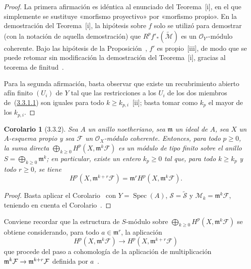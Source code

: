 \documentclass[10pt,oneside,openany]{book}
\theoremstyle{egaenv}\newtheorem*{env}{---}
\theoremstyle{egastatement}
\newtheorem*{corollary}{Corolario}
\theoremstyle{egadescription}
\renewcommand{\geq}{\geqslant}
\renewcommand{\to}{\mathchoice{\longrightarrow}{\rightarrow}{\rightarrow}{\rightarrow}}
\begin{document}
\begin{proof}
La primera afirmación es idéntica al enunciado del Teorema~[i], en el que simplemente se sustituye «morfismo proyectivo» por «morfismo propio».
En la demostración del Teorema~[i], la hipótesis sobre $f$ solo se utilizó para demostrar (con la notación de aquella demostración) que $R^pf'_*(\widetilde{\mathcal M})$ es un $\mathcal O_{Y'}$-módulo coherente.
Bajo las hipótesis de la Proposición~, $f'$ es propio~[iii], de modo que se puede retomar sin modificación la demostración del Teorema~[i], gracias al teorema de finitud~.

Para la segunda afirmación, basta observar que existe un recubrimiento abierto afín finito $(U_i)$ de $Y$ tal que las restricciones a los $U_i$ de los dos miembros de~(\hyperref[III.3.3.1.1]{3.3.1.1}) son iguales para todo $k\geq k_{p,i}$~[ii]; basta tomar como $k_p$ el mayor de los $k_{p,i}$.
\end{proof}

\begin{corollary}[3.3.2]
\label{III.3.3.2}
\label{III.3.3.2-fr}
Sea $A$ un anillo noetheriano, sea $\mathfrak m$ un ideal de $A$, sea $X$ un $A$-esquema propio y sea $\mathcal F$ un $\mathcal O_X$-módulo coherente.
Entonces, para todo $p\geq0$, la suma directa $\bigoplus_{k\geq0}H^p(X,\mathfrak m^k\mathcal F)$ es un módulo de tipo finito sobre el anillo $S=\bigoplus_{k\geq0}\mathfrak m^k$; en particular, existe un entero $k_p\geq0$ tal que, para todo $k\geq k_p$ y todo $r\geq0$, se tiene
\[
H^p(X,\mathfrak m^{k+r}\mathcal F)
=\mathfrak m^rH^p(X,\mathfrak m^k\mathcal F).
\tag{3.3.3.1}\label{III.3.3.2.1-fr}
\]
\end{corollary}

\begin{proof}
Basta aplicar el Corolario~ con $Y=\operatorname{Spec}(A)$, $\mathcal S=\widetilde{\mathcal S}$ y $\mathcal M_k=\mathfrak m^k\mathcal F$, teniendo en cuenta el Corolario~.
\end{proof}

Conviene recordar que la estructura de $S$-módulo sobre $\bigoplus_{k\geq0}H^p(X,\mathfrak m^k\mathcal F)$ se obtiene considerando, para todo $a\in\mathfrak m^r$, la aplicación \[
H^p(X,\mathfrak m^k\mathcal F)
\longrightarrow H^p(X,\mathfrak m^{k+r}\mathcal F)
\] que procede del paso a cohomología de la aplicación de multiplicación $\mathfrak m^k\mathcal F\to\mathfrak m^{k+r}\mathcal F$ definida por $a$~.
\end{document}
